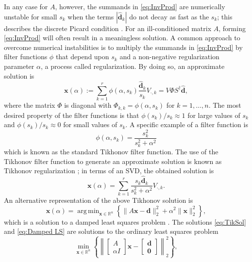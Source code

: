 \documentclass[12pt]{article}
\newcommand{\dVec}{\mathbf{d}}	%
\newcommand{\xVec}{\mathbf{x}}	%
\newcommand{\regparam}{\alpha}
\DeclareMathOperator*{\argmin}{arg\,min}
\newcommand{\filt}{\phi}
\newcommand{\zeroVec}{\bm{0}}	%
\newcommand{\singular}{s}	%
\newcommand{\svd}[1]{\widehat{#1}}	%
\begin{document}
In any case for $A$, however, the summands in \eqref{eq:InvProd} are numerically unstable for small $\singular_k$ when the terms $|\svd{\dVec}_k|$ do not decay as fast as the $s_k$; this describes the discrete Picard condition \cite{Hansen:98}. For an ill-conditioned matrix $A$, forming \eqref{eq:InvProd} will often result in a meaningless solution. A common approach to overcome numerical instabilities is to multiply the summands in \eqref{eq:InvProd} by filter functions $\filt$ that depend upon $\singular_k$ and a non-negative regularization parameter $\regparam$, a process called regularization. By doing so, an approximate solution is
\begin{equation}
\label{eq:ApproxSol}
\xVec(\regparam) := \sum_{k=1}^{r} \filt(\regparam,\singular_k) \frac{\svd{\dVec}_k}{\singular_k}V_{\cdot,k}  = V\Phi{S}^\dagger\svd{\dVec},
\end{equation}
where the matrix $\Phi$ is diagonal with $\Phi_{k,k} = \filt(\regparam,\singular_k)$ for $k = 1,\ldots,{n}$. The most desired property of the filter functions is that $\filt(\singular_k)/\singular_k \approx 1$  for large values of $\singular_k$ and $\filt(\singular_k)/\singular_k \approx 0$ for small values of $\singular_k$. A specific example of a filter function is
\begin{equation}
\label{eq:TikFilt}
\filt(\regparam,\singular_k)  = \frac{\singular_k^2}{\singular_k^2 + \regparam^2}
\end{equation}
which is known as the standard Tikhonov filter function. The use of the Tikhonov filter function to generate an approximate solution is known as Tikhonov regularization \cite{Tikh1963}; in terms of an SVD, the obtained solution is
\begin{equation}
\label{eq:TikSol}
\xVec(\regparam) = \sum_{k = 1}^{r} \frac{\singular_k \svd{\dVec}_k}{\singular_k^2 + \regparam^2}V_{\cdot,k}.
\end{equation}
An alternative representation of the above Tikhonov solution is
\begin{equation}
\label{eq:Damped LS}
\xVec(\regparam) = \argmin_{\xVec \in \mathbb{R}^n} \left\{\|A\xVec - \dVec\|_2^2 + \regparam^2\|\xVec\|_2^2\right\},
\end{equation}
which is a solution to a damped least squares problem \cite{ABT}. The solutions \eqref{eq:TikSol} and \eqref{eq:Damped LS} are solutions to the ordinary least squares problem
\begin{equation}
\label{eq:Ordinary LS}
\min_{\xVec \in \mathbb{R}^n} \left\{\left\|
\begin{bmatrix}
A \\
\regparam I
\end{bmatrix}\xVec - 
\begin{bmatrix}
\dVec \\
\zeroVec
\end{bmatrix}
\right\|_2^2\right\},
\end{equation}
\end{document}
